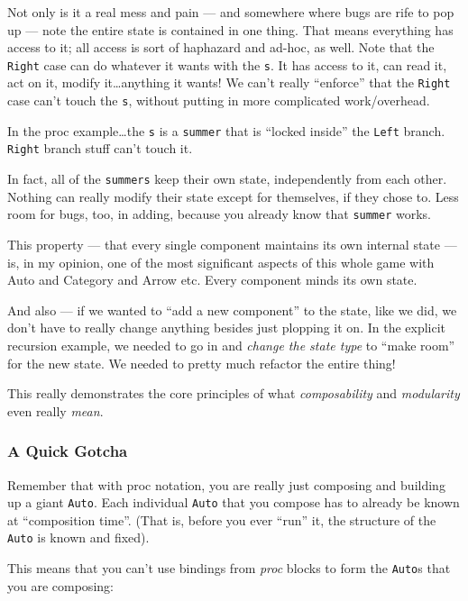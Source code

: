 \documentclass[]{article}
\begin{document}
Not only is it a real mess and pain --- and somewhere where bugs are rife to pop
up --- note the entire state is contained in one thing. That means everything
has access to it; all access is sort of haphazard and ad-hoc, as well. Note that
the \texttt{Right} case can do whatever it wants with the \texttt{s}. It has
access to it, can read it, act on it, modify it\ldots anything it wants! We
can't really ``enforce'' that the \texttt{Right} case can't touch the
\texttt{s}, without putting in more complicated work/overhead.

In the proc example\ldots the \texttt{s} is a \texttt{summer} that is ``locked
inside'' the \texttt{Left} branch. \texttt{Right} branch stuff can't touch it.

In fact, all of the \texttt{summers} keep their own state, independently from
each other. Nothing can really modify their state except for themselves, if they
chose to. Less room for bugs, too, in adding, because you already know that
\texttt{summer} works.

This property --- that every single component maintains its own internal state
--- is, in my opinion, one of the most significant aspects of this whole game
with Auto and Category and Arrow etc. Every component minds its own state.

And also --- if we wanted to ``add a new component'' to the state, like we did,
we don't have to really change anything besides just plopping it on. In the
explicit recursion example, we needed to go in and \emph{change the state type}
to ``make room'' for the new state. We needed to pretty much refactor the entire
thing!

This really demonstrates the core principles of what \emph{composability} and
\emph{modularity} even really \emph{mean}.

\hypertarget{a-quick-gotcha}{%
\subsubsection{A Quick Gotcha}\label{a-quick-gotcha}}

Remember that with proc notation, you are really just composing and building up
a giant \texttt{Auto}. Each individual \texttt{Auto} that you compose has to
already be known at ``composition time''. (That is, before you ever ``run'' it,
the structure of the \texttt{Auto} is known and fixed).

This means that you can't use bindings from \emph{proc} blocks to form the
\texttt{Auto}s that you are composing:
\end{document}
